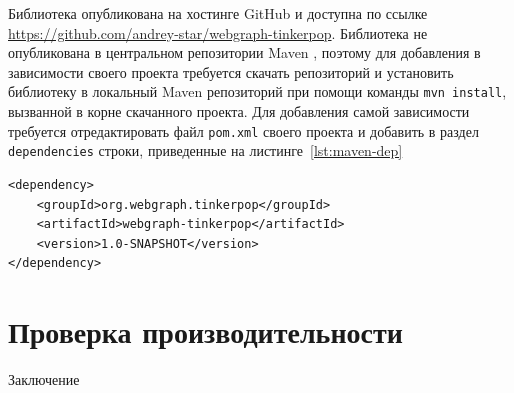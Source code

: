 \documentclass[times,specification,annotation]{itmo-student-thesis}
\begin{document}
Библиотека опубликована на хостинге GitHub и доступна по ссылке \url{https://github.com/andrey-star/webgraph-tinkerpop}. Библиотека не опубликована в центральном репозитории Maven \cite{maven}, поэтому для добавления в зависимости своего проекта требуется скачать репозиторий и установить библиотеку в локальный Maven репозиторий при помощи команды \texttt{mvn install}, вызванной в корне скачанного проекта. Для добавления самой зависимости требуется отредактировать файл \texttt{pom.xml} своего проекта и добавить в раздел \texttt{dependencies} строки, приведенные на листинге~\ref{lst:maven-dep}

\begin{lstlisting}[float=!h,caption={Добавление разработанной библиотеки в зависимости проекта},label={lst:maven-dep}]
<dependency>
    <groupId>org.webgraph.tinkerpop</groupId>
    <artifactId>webgraph-tinkerpop</artifactId>
    <version>1.0-SNAPSHOT</version>
</dependency>
\end{lstlisting}

\chapterconclusion

\chapter{Проверка производительности}

\chapterconclusion

\startconclusionpage

Заключение

\printmainbibliography
\end{document}
